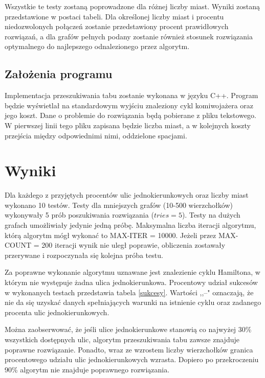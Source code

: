 \documentclass[11pt,a4paper,twoside]{article}
\begin{document}
Wszystkie te testy zostaną poprowadzone dla różnej liczby miast. Wyniki zostaną przedstawione w postaci tabeli. Dla określonej liczby miast i procentu niedozwolonych połączeń zostanie przedstawiony procent prawidłowych rozwiązań, a dla grafów pełnych podany zostanie również stosunek rozwiązania optymalnego do najlepszego odnalezionego przez algorytm. 
\subsection{Założenia programu}
Implementacja przeszukiwania tabu zostanie wykonana w języku C++. Program będzie wyświetlał na standardowym wyjściu znaleziony cykl komiwojażera oraz jego koszt. Dane o problemie do rozwiązania będą pobierane z pliku tekstowego. W pierwszej linii tego pliku zapisana będzie liczba miast, a w kolejnych koszty przejścia między odpowiednimi nimi, oddzielone spacjami.

\section{Wyniki}
Dla każdego z przyjętych procentów ulic jednokierunkowych oraz liczby miast wykonano 10 testów. Testy dla mniejszych grafów (10-500 wierzchołków) wykonywały 5 prób poszukiwania rozwiązania ($tries=5$). Testy na dużych grafach umożliwiały jedynie jedną próbę. Maksymalna liczba iteracji algorytmu, którą algorytm mógł wykonać to MAX-ITER = 10000. Jeżeli przez MAX-COUNT = 200 iteracji wynik nie uległ poprawie, obliczenia zostawały przerywane i rozpoczynała się kolejna próba testu.

Za poprawne wykonanie algorytmu uznawane jest znalezienie cyklu Hamiltona, w którym nie występuje żadna ulica jednokierunkowa. Procentowy udział sukcesów w wykonanych testach przedstawia tabela \ref{sukcesy}. Wartości ,,--" oznaczają, że nie da się uzyskać danych spełniających warunki na istnienie cyklu oraz zadanego procenta ulic jednokierunkowych. 

Można zaobserwować, że jeśli ulice jednokierunkowe stanowią co najwyżej 30\% wszystkich dostępnych ulic, algorytm przeszukiwania tabu zawsze znajduje poprawne rozwiązanie. Ponadto, wraz ze wzrostem liczby wierzchołków granica procentowego udziału ulic jednokierunkowych wzrasta. Dopiero po przekroczeniu 90\% algorytm nie znajduje poprawnego rozwiązania.
\end{document}

